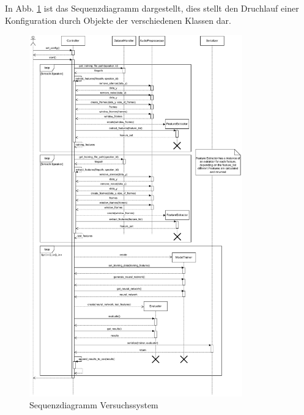 In Abb. \ref{fig:sequenzdiagramm-versuchssystem} ist das Sequenzdiagramm dargestellt, dies stellt den Druchlauf einer Konfiguration durch Objekte der verschiedenen Klassen dar.
\begin{figure}[H]
    \centering
    \includegraphics[width=0.82\textwidth, keepaspectratio]{images/versuchssytem_sequenzdiagramm.pdf}
    \caption{Sequenzdiagramm Versuchssystem}
    \label{fig:sequenzdiagramm-versuchssystem}
\end{figure}\noindent




